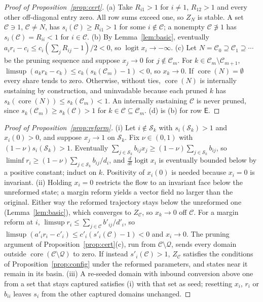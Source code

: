 \documentclass[letterpaper]{article} %
\theoremstyle{definition}
\newcommand{\core}{\operatorname{core}}
\newcommand{\dE}{\mathsf{E}}
\newcommand{\cC}{\mathcal{C}}
\newcommand{\cQ}{\mathcal{Q}}
\newcommand{\cS}{\mathcal{S}}
\begin{document}
\begin{proof}[Proof of Proposition~\ref{prop:cert}]
(a) Take $R_{i1}>1$ for $i\neq1$, $R_{12}>1$ and every other off-diagonal entry zero. All row sums exceed one, so $Z_N$ is stable. A set $\cC\ni1$, $\cC\neq N$, has $s_i(\cC)\ge R_{i1}>1$ for some $i\notin\cC$; a nonempty $\cC\not\ni1$ has $s_i(\cC)=R_{ii}<1$ for $i\in\cC$. (b) By Lemma~\ref{lem:basic}, eventually $a_ir_i-c_i\le c_i(\sum_jR_{ij}-1)/2<0$, so $\operatorname{logit}x_i\to-\infty$. (c) Let $N=\cC_0\supseteq\cC_1\supseteq\cdots$ be the pruning sequence and suppose $x_j\to0$ for $j\notin\cC_m$. For $k\in\cC_m\setminus\cC_{m+1}$, $\limsup(a_kr_k-c_k)\le c_k(s_k(\cC_m)-1)<0$, so $x_k\to0$. If $\core(N)=\emptyset$ every share tends to zero. Otherwise, without ties, $\core(N)$ is internally sustaining by construction, and uninvadable because each pruned $k$ has $s_k(\core(N))\le s_k(\cC_m)<1$. An internally sustaining $\cC$ is never pruned, since $s_k(\cC_m)\ge s_k(\cC)>1$ for $k\in\cC\subseteq\cC_m$. (d) is (b) for row $\dE$.
\end{proof}

\begin{proof}[Proof of Proposition~\ref{prop:reform}]
(i) Let $i\notin\cS_k$ with $s_i(\cS_k)>1$ and $x_i(0)>0$, and suppose $x_j\to1$ on $\cS_k$. Fix $\nu\in(0,1)$ with $(1-\nu)s_i(\cS_k)>1$. Eventually $\sum_{j\in\cS_k}b_{ij}x_j\ge(1-\nu)\sum_{j\in\cS_k}b_{ij}$, so $\liminf r_i\ge(1-\nu)\sum_{j\in\cS_k}b_{ij}/d_i$, and $\frac{d}{dt}\operatorname{logit}x_i$ is eventually bounded below by a positive constant; induct on $k$. Positivity of $x_i(0)$ is needed because $x_i=0$ is invariant. (ii) Holding $x_i=0$ restricts the flow to an invariant face below the unreformed state; a margin reform yields a vector field no larger than the original. Either way the reformed trajectory stays below the unreformed one (Lemma~\ref{lem:basic}), which converges to $Z_\cC$, so $x_k\to0$ off $\cC$. For a margin reform at $i$, $\limsup r_i\le\sum_{j\in\cC}b'_{ij}/d'_i$, so $\limsup(a'_ir_i-c'_i)\le c'_i(s'_i(\cC)-1)<0$ and $x_i\to0$. The pruning argument of Proposition~\ref{prop:cert}(c), run from $\cC\setminus\cQ$, sends every domain outside $\core(\cC\setminus\cQ)$ to zero. If instead $s'_i(\cC)>1$, $Z_\cC$ satisfies the conditions of Proposition~\ref{prop:config} under the reformed parameters, and states near it remain in its basin. (iii) A re-seeded domain with inbound conversion above one from a set that stays captured satisfies (i) with that set as seed; resetting $x_i$, $r_i$ or $b_{ii}$ leaves $s_i$ from the other captured domains unchanged.
\end{proof}
\end{document}
